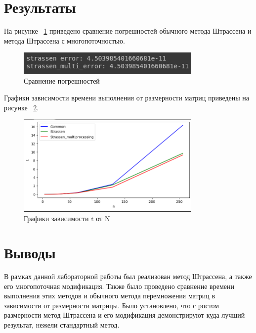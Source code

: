 \documentclass[a4paper, 14pt]{extarticle}
\begin{document}
\section{Результаты}


На рисунке ~\ref{fig:img1} приведено сравнение погрешностей обычного метода Штрассена и метода Штрассена с многопоточностью.


\begin{figure}[H]
\centering
\includegraphics[width=0.8\textwidth]{images/res1.png}
\caption{Сравнение погрешностей}
\label{fig:img1}
\end{figure}

Графики зависимости времени выполнения от размерности матриц приведены на рисунке ~\ref{fig:img2}.

\begin{figure}[H]
\centering
\includegraphics[width=0.8\textwidth]{images/res2.png}
\caption{Графики зависимости t от N}
\label{fig:img2}
\end{figure}


\section{Выводы}
В рамках данной лабораторной работы был реализован метод Штрассена, а также его многопоточная модификация. Также было проведено сравнение времени выполнения этих методов и обычного метода перемножения матриц в зависимости от размерности матрицы. Было установлено, что с ростом размерности метод Штрассена и его модификация демонстрируют куда лучший результат, нежели стандартный метод.
\end{document}

